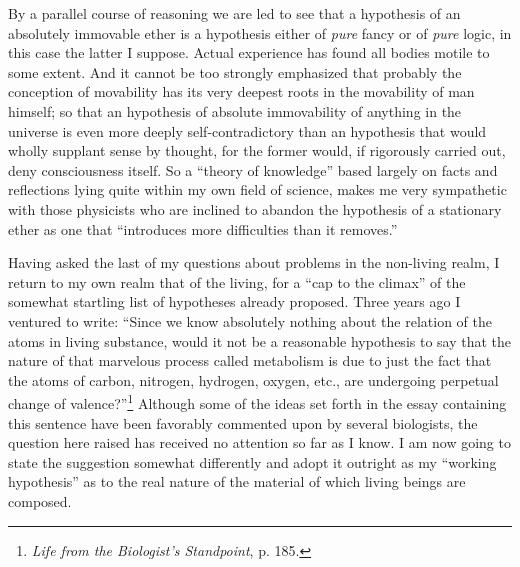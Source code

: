 \documentclass[a4paper, 11pt, oneside, polutonikogreek, english]{article}
\begin{document}
By a parallel course of reasoning we are led to see that a hypothesis of an absolutely immovable ether is a hypothesis either of \emph{pure} fancy or of \emph{pure} logic, in this case the latter I suppose. Actual experience has found all bodies motile to some extent. And it cannot be too strongly emphasized that probably the conception of movability has its very deepest roots in the movability of man himself; so that an hypothesis of absolute immovability of anything in the universe is even more deeply self-contradictory than an hypothesis that would wholly supplant sense by thought, for the former would, if rigorously carried out, deny consciousness itself. So a ``theory of knowledge'' based largely on facts and reflections lying quite within my own field of science, makes me very sympathetic with those physicists who are inclined to abandon the hypothesis of a stationary ether as one that ``introduces more difficulties than it removes.''

Having asked the last of my questions about problems in the non-living realm, I return to my own realm that of the living, for a ``cap to the climax'' of the somewhat startling list of hypotheses already proposed. Three years ago I ventured to write: ``Since we know absolutely nothing about the relation of the atoms in living substance, would it not be a reasonable hypothesis to say that the nature of that marvelous process called metabolism is due to just the fact that the atoms of carbon, nitrogen, hydrogen, oxygen, etc., are undergoing perpetual change of valence?''\footnote{\emph{Life from the Biologist's Standpoint}, p. 185.} Although some of the ideas set forth in the essay containing this sentence have been favorably commented upon by several biologists, the question here raised has received no attention so far as I know. I am now going to state the suggestion somewhat differently and adopt it outright as my ``working hypothesis'' as to the real nature of the material of which living beings are composed.
\end{document}
